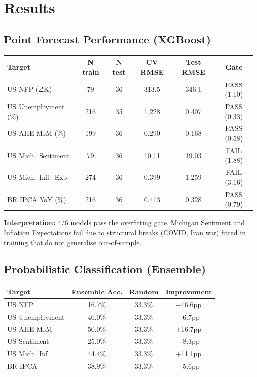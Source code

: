 \documentclass[11pt,a4paper]{article}
\begin{document}
\newpage

\section*{Results}

\subsection*{Point Forecast Performance (XGBoost)}

\begin{table}[H]
\centering\small
\begin{tabular}{lccccc}
\toprule
\textbf{Target} & \textbf{N train} & \textbf{N test} & \textbf{CV RMSE} & \textbf{Test RMSE} & \textbf{Gate} \\
\midrule
US NFP ($\Delta$K)     & 79  & 36 & 313.5 & 346.1 & PASS (1.10) \\
US Unemployment (\%)   & 216 & 35 & 1.228 & 0.407 & PASS (0.33) \\
US AHE MoM (\%)        & 199 & 36 & 0.290 & 0.168 & PASS (0.58) \\
US Mich.\ Sentiment    & 79  & 36 & 10.11 & 19.03 & FAIL (1.88) \\
US Mich.\ Infl.\ Exp   & 274 & 36 & 0.399 & 1.259 & FAIL (3.16) \\
BR IPCA YoY (\%)       & 216 & 36 & 0.413 & 0.328 & PASS (0.79) \\
\bottomrule
\end{tabular}
\end{table}

\noindent\textbf{Interpretation:} 4/6 models pass the overfitting gate. Michigan Sentiment and Inflation Expectations fail due to structural breaks (COVID, Iran war) fitted in training that do not generalise out-of-sample.

\subsection*{Probabilistic Classification (Ensemble)}
\begin{table}[H]
\centering\small
\begin{tabular}{lccc}
\toprule
\textbf{Target} & \textbf{Ensemble Acc.} & \textbf{Random} & \textbf{Improvement} \\
\midrule
US NFP          & 16.7\% & 33.3\% & $-$16.6pp \\
US Unemployment & 40.0\% & 33.3\% & $+$6.7pp \\
US AHE MoM     & 50.0\% & 33.3\% & $+$16.7pp \\
US Sentiment   & 25.0\% & 33.3\% & $-$8.3pp \\
US Mich.\ Inf  & 44.4\% & 33.3\% & $+$11.1pp \\
BR IPCA        & 38.9\% & 33.3\% & $+$5.6pp \\
\bottomrule
\end{tabular}
\end{table}
\end{document}
